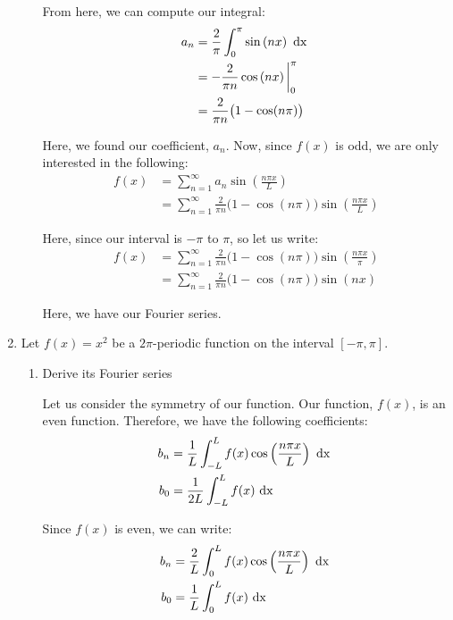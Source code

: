 \documentclass{article}
\begin{document}
\begin{enumerate}
\begin{enumerate}
    From here, we can compute our integral:
    \begin{align}
      a_n & = \frac{2}{\pi } \int^\pi_0 \sin\left( n x \right) \text{ dx }\\
      & = -\frac{2}{\pi n} \cos\left( n x \right) \bigg|^\pi_0\\
      & = \frac{2}{\pi n}\big( 1 - \cos( n \pi ) \big)
    \end{align}

    Here, we found our coefficient, $a_n$. Now, since $f(x)$ is odd, we are only interested in the following:
    \begin{align}
      f(x) & = \sum^\infty_{n = 1} a_n \sin\left( \frac{n \pi x}{L} \right)\\
      & = \sum^\infty_{n = 1}
      \frac{2}{\pi n}\big( 1 - \cos( n \pi ) \big)
      \sin\left( \frac{n \pi x}{L} \right)
    \end{align}

    Here, since our interval is $-\pi$ to $\pi$, so let us write:
    \begin{align}
      f(x) & =
      \sum^\infty_{n = 1}
      \frac{2}{\pi n}\big( 1 - \cos( n \pi ) \big)
      \sin\left( \frac{n \pi x}{\pi} \right)\\
      & =
      \sum^\infty_{n = 1}
      \frac{2}{\pi n}\big( 1 - \cos( n \pi ) \big)
      \sin\left( n x \right)
    \end{align}

    Here, we have our Fourier series.
%
%
\newpage
%
%
\end{enumerate}
  \item Let $f(x) = x^2$ be a $2 \pi$-periodic function on the interval $[-\pi, \pi]$.
  \begin{enumerate}
    \item Derive its Fourier series

    Let us consider the symmetry of our function. Our function, $f(x)$, is an even function. Therefore, we have the following coefficients:
%
    \begin{align}
      b_n & = \frac{1}{L}  \int^L_{-L} f(x) \cos\left( \frac{n \pi x}{L} \right) \text{ dx }\\
      b_0 & = \frac{1}{2L} \int^L_{-L} f(x) \text{ dx }
    \end{align}

    Since $f(x)$ is even, we can write:
    \begin{align}
      b_n & = \frac{2}{L}  \int^L_0 f(x) \cos\left( \frac{n \pi x}{L} \right) \text{ dx }\\
      b_0 & = \frac{1}{L} \int^L_0 f(x) \text{ dx }
    \end{align}


\end{enumerate}
\end{enumerate}
\end{document}
